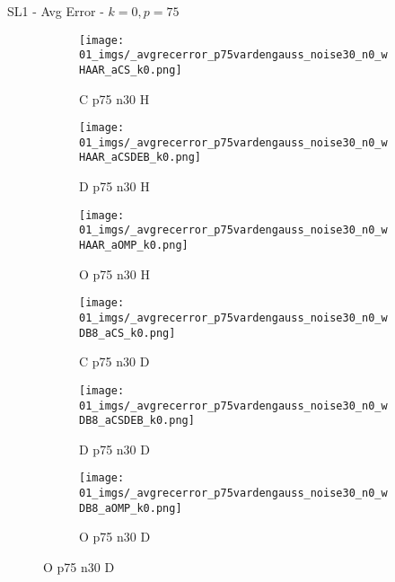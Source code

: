 \begin{frame}{SL1 - Avg Error - $k=0,p=75$}{}
\begin{figure}
\vspace{5pt}

\begin{subfigure}{0.13\textwidth}
\texttt{[image: 01\_imgs/\_avgrecerror\_p75vardengauss\_noise30\_n0\_wHAAR\_aCS\_k0.png]}
\caption*{\tiny C p75 n30 H}
\end{subfigure}
\begin{subfigure}{0.13\textwidth}
\texttt{[image: 01\_imgs/\_avgrecerror\_p75vardengauss\_noise30\_n0\_wHAAR\_aCSDEB\_k0.png]}
\caption*{\tiny D p75 n30 H}
\end{subfigure}
\begin{subfigure}{0.13\textwidth}
\texttt{[image: 01\_imgs/\_avgrecerror\_p75vardengauss\_noise30\_n0\_wHAAR\_aOMP\_k0.png]}
\caption*{\tiny O p75 n30 H}
\end{subfigure}
\begin{subfigure}{0.13\textwidth}
\texttt{[image: 01\_imgs/\_avgrecerror\_p75vardengauss\_noise30\_n0\_wDB8\_aCS\_k0.png]}
\caption*{\tiny C p75 n30 D}
\end{subfigure}
\begin{subfigure}{0.13\textwidth}
\texttt{[image: 01\_imgs/\_avgrecerror\_p75vardengauss\_noise30\_n0\_wDB8\_aCSDEB\_k0.png]}
\caption*{\tiny D p75 n30 D}
\end{subfigure}
\begin{subfigure}{0.13\textwidth}
\texttt{[image: 01\_imgs/\_avgrecerror\_p75vardengauss\_noise30\_n0\_wDB8\_aOMP\_k0.png]}
\caption*{\tiny O p75 n30 D}
\end{subfigure}
\end{figure}
\end{frame}


